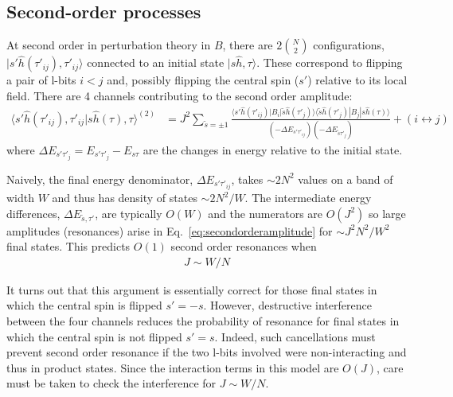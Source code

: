 \documentclass[aps,pra,twocolumn,a4paper,showpacs,superscriptaddress,floatfix,10pt]{revtex4}
\newcommand{\ket}[1]{|#1\rangle}
\newcommand{\braket}[2]{\langle#1|#2\rangle}
\begin{document}
\begin{widetext}

\section{Second-order processes}
\label{app:pt_second_order_details}

At second order in perturbation theory in $B$, there are $2 \binom{N}{2}$ configurations, $\ket{s' \hat{h}(\tau'_{ij}), \tau'_{ij}}$ connected to an initial state $\ket{s \hat{h}, \tau}$.
These correspond to flipping a pair of l-bits $i < j$ and, possibly flipping the central spin ($s'$) relative to its local field.
There are 4 channels contributing to the second order amplitude:
\newcommand{\ts}{\tilde{s}}
\begin{align}
\label{eq:secondorderamplitude}
\braket{s' \hat{h}(\tau'_{ij}), \tau'_{ij}}{s\hat{h}(\tau), \tau}^{(2)} &=
J^2 \sum_{\ts=\pm 1} \frac{\langle s' \hat{h}(\tau'_{ij})|B_i|\ts \hat{h}(\tau'_j)\rangle \langle \ts \hat{h}(\tau'_j)|B_j|s\hat{h}(\tau)\rangle}{(- \Delta E_{s' \tau'_{ij}})(- \Delta E_{\ts \tau'_j})} + (i \leftrightarrow j)
\end{align}
where $\Delta E_{s'\tau'_j} = E_{s'\tau'_j} - E_{s\tau}$ are the changes in energy relative to the initial state.

Naively, the final energy denominator, $\Delta E_{s' \tau'_{ij}}$, takes $\sim 2N^2$ values on a band of width $W$ and thus has density of states $\sim 2N^2/W$.
The intermediate energy differences, $\Delta E_{\ts, \tau'}$, are typically $O(W)$ and the numerators are $O(J^2)$ so large amplitudes (resonances) arise in Eq.~\eqref{eq:secondorderamplitude} for $\sim J^2 N^2/ W^2$ final states.
This predicts $O(1)$ second order resonances when
\begin{align}
	J \sim W/N
\end{align}

It turns out that this argument is essentially correct for those final states in which the central spin is flipped $s' = -s$.
However, destructive interference between the four channels reduces the probability of resonance for final states in which the central spin is not flipped $s' = s$.
%
Indeed, such cancellations must prevent second order resonance if the two l-bits involved were non-interacting and thus in product states.
Since the interaction terms in this model are $O(J)$, care must be taken to check the interference for $J \sim W/N$.


\end{widetext}
\end{document}
